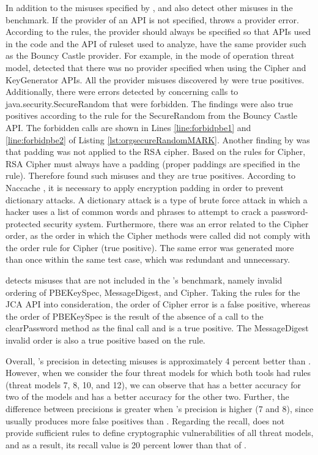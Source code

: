In addition to the misuses specified by \cryptoapibench{}, \codyze{} and \cognicryptsast{} also detect other misuses in the benchmark. If the provider of an API is not specified, \codyze{} throws a provider error. According to the \MARK{} rules, the provider should always be specified so that APIs used in the code and the API of \MARK{} ruleset used to analyze, have the same provider such as the Bouncy Castle provider. For example, in the mode of operation threat model, \codyze{} detected that there was no provider specified when using the Cipher and KeyGenerator APIs. All the provider misuses discovered by \codyze{} were true positives. Additionally, there were errors detected by \codyze{} concerning calls to java.security.SecureRandom that were forbidden. The findings were also true positives according to the \MARK{} rule for the SecureRandom from the Bouncy Castle API. The forbidden calls are shown in Lines \ref{line:forbidpbe1} and \ref{line:forbidpbe2} of Listing \ref{lst:orgsecureRandomMARK}.
Another finding by \codyze{} was that padding was not applied to the RSA cipher. Based on the \MARK{} rules for Cipher, RSA Cipher must always have a padding (proper paddings are specified in the rule). Therefore \codyze{} found such misuses and they are true positives. According to Naccache \etal \cite{rsapadding}, it is necessary to apply encryption padding in order to prevent dictionary attacks. A dictionary attack is a type of brute force attack in which a hacker uses a list of common words and phrases to attempt to crack a password-protected security system. Furthermore, there was an error related to the Cipher order, as the order in which the Cipher methods were called did not comply with the \MARK{} order rule for Cipher (true positive). The same error was generated more than once within the same test case, which was redundant and unnecessary. 

\cognicryptsast{} detects misuses that are not included in the \cryptoapibench's benchmark, namely invalid ordering of PBEKeySpec, MessageDigest, and Cipher.
Taking the \crysl{} rules for the JCA API into consideration, the order of Cipher error is a false positive, whereas the order of PBEKeySpec is the result of the absence of a call to the clearPassword method as the final call and is a true positive. The MessageDigest invalid order is also a true positive based on the \crysl{} rule.


Overall, \codyze's precision in detecting misuses is approximately 4 percent better than \cognicryptsast. However, when we consider the four threat models for which both tools had rules (threat models 7, 8, 10, and 12), we can observe that \cognicryptsast{} has a better accuracy for two of the models and \codyze{} has a better accuracy for the other two. Further, the difference between precisions is greater when \cognicryptsast's precision is higher (7 and 8), since \codyze{} usually produces more false positives than \cognicryptsast. Regarding the recall, \codyze{} does not provide sufficient \MARK{} rules to define cryptographic vulnerabilities of all threat models, and as a result, its recall value is 20 percent lower than that of \cognicryptsast. 




